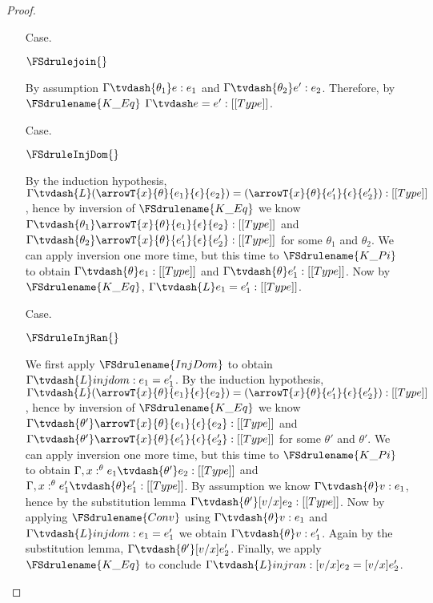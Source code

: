 \begin{proof}
\begin{itemize}

  \item[Case.] \ \\
    \begin{center}
      $\FSdrulejoin{}$
    \end{center}
    By assumption $\Gamma \tvdash{\theta_1} e:e_1$ and $\Gamma \tvdash{\theta_2} e':e_2$.  
    Therefore, by $\FSdrulename{K\_Eq}$ $\Gamma \tvdash e = e':[[Type]]$.

  \item[Case.] \ \\
    \begin{center}
      $\FSdruleInjDom{}$
    \end{center}
    By the induction hypothesis, 
    $\Gamma \tvdash{L} (\arrowT{x}{\theta}{e_1}{\epsilon}{e_2}) = 
    (\arrowT{x}{\theta}{e'_1}{\epsilon}{e'_2}):[[Type]]$, hence by inversion of 
    $\FSdrulename{K\_Eq}$ we know
    $\Gamma \tvdash{\theta_1} \arrowT{x}{\theta}{e_1}{\epsilon}{e_2}:[[Type]]$ and
    $\Gamma \tvdash{\theta_2} \arrowT{x}{\theta}{e'_1}{\epsilon}{e'_2}:[[Type]]$ for some $\theta_1$
    and $\theta_2$.  We can apply inversion one more time, but this time to 
    $\FSdrulename{K\_Pi}$ to obtain $\Gamma \tvdash{\theta} e_1:[[Type]]$ and 
    $\Gamma \tvdash{\theta} e'_1:[[Type]]$.  Now by 
    $\FSdrulename{K\_Eq}$, $\Gamma \tvdash{L} e_1 = e'_1:[[Type]]$.

  \item[Case.] \ \\
    \begin{center}
      $\FSdruleInjRan{}$
    \end{center}
    We first apply $\FSdrulename{InjDom}$ to obtain $\Gamma \tvdash{L} injdom:e_1 = e'_1$.
    By the induction hypothesis, 
    $\Gamma \tvdash{L} (\arrowT{x}{\theta}{e_1}{\epsilon}{e_2}) = 
    (\arrowT{x}{\theta}{e'_1}{\epsilon}{e'_2}):[[Type]]$, hence by inversion of 
    $\FSdrulename{K\_Eq}$ we know
    $\Gamma \tvdash{\theta'} \arrowT{x}{\theta}{e_1}{\epsilon}{e_2}:[[Type]]$ and
    $\Gamma \tvdash{\theta'} \arrowT{x}{\theta}{e'_1}{\epsilon}{e'_2}:[[Type]]$ for some $\theta'$
    and $\theta'$.  We can apply inversion one more time, but this time to 
    $\FSdrulename{K\_Pi}$ to obtain $\Gamma,x:^\theta e_1 \tvdash{\theta'} e_2:[[Type]]$ and 
    $\Gamma,x:^\theta e'_1 \tvdash{\theta} e'_1:[[Type]]$.  By assumption we know
    $\Gamma \tvdash{\theta} v:e_1$, hence by the substitution lemma 
    $\Gamma \tvdash{\theta'}[v/x]e_2:[[Type]]$.  Now by applying $\FSdrulename{Conv}$ using
    $\Gamma \tvdash{\theta} v:e_1$ and $\Gamma \tvdash{L} injdom:e_1 = e'_1$ we obtain
    $\Gamma \tvdash{\theta} v:e'_1$.  Again by the substitution lemma, 
    $\Gamma \tvdash{\theta'} [v/x]e'_2$.  Finally, we apply $\FSdrulename{K\_Eq}$ to conclude
    $\Gamma \tvdash{L} injran:[v/x]e_2 = [v/x]e'_2$.


\end{itemize}
\end{proof}
